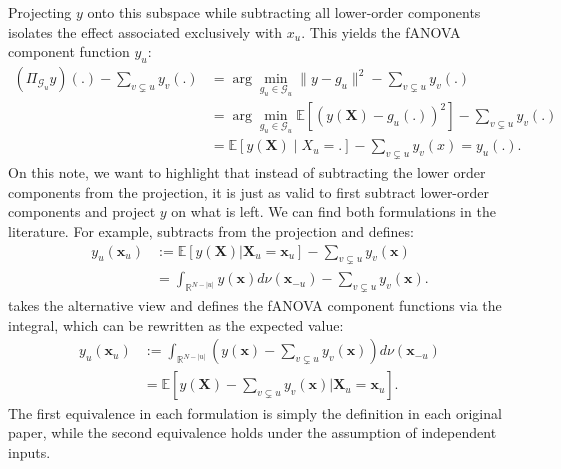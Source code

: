 Projecting $y$ onto this subspace while subtracting all lower-order components 
isolates the effect associated exclusively with $x_u$. This yields the fANOVA component function $y_u$:
\begin{align*}
    (\Pi_{\mathcal{G}_u}y)(.) - \sum_{v \subsetneq u} y_v(.)
    &= \arg \min_{g_u \in \mathcal{G}_u} \|y - g_u\|^2 - \sum_{v \subsetneq u} y_v(.)\\
    &= \arg \min_{g_u \in \mathcal{G}_{u}} \mathbb{E}[(y(\boldsymbol{X}) - g_u(.))^2] - \sum_{v \subsetneq u} y_v(.)\\
    &= \mathbb{E}[y(\boldsymbol{X}) \mid X_{u} = .] - \sum_{v \subsetneq u} y_v(x) = y_u(.).
\end{align*}
On this note, we want to highlight that instead of subtracting the lower order components from the projection, it is just as valid to first subtract lower-order components and project $y$ on what is left.
We can find both formulations in the literature.
For example, \cite{muehlenstaedt2012} subtracts from the projection and defines:
\begin{align*}
    y_u(\boldsymbol{x}_u) &:=
    \mathbb{E}[y(\boldsymbol{X}) | \boldsymbol{X}_{u} = \boldsymbol{x}_u] - \sum_{v \subsetneq u} y_v(\boldsymbol{x}) \\
    &= \int_{\mathbb{R}^{N-|u|}} y(\boldsymbol{x}) d \nu(\boldsymbol{x}_{-u}) - \sum_{v \subsetneq u} y_v(\boldsymbol{x}).
\end{align*}
\cite{hooker2004} takes the alternative view and defines the fANOVA component functions via the integral, which can be rewritten as the expected value:
\begin{align*}
    y_u(\boldsymbol{x}_u)
    &:= \int_{\mathbb{R}^{N-|u|}} (y(\boldsymbol{x}) - \sum_{v \subsetneq u} y_v(\boldsymbol{x})) d \nu(\boldsymbol{x}_{-u}) \\
    &= \mathbb{E}[y(\boldsymbol{X}) - \sum_{v \subsetneq u} y_v(\boldsymbol{x}) | \boldsymbol{X}_{u} = \boldsymbol{x}_u ].
\end{align*}
The first equivalence in each formulation is simply the definition in each original paper, while the second equivalence holds under the assumption of independent inputs.

